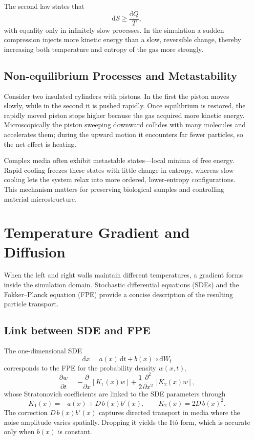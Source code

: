 \documentclass[12pt,a4paper]{article}
\begin{document}
The second law states that
\begin{equation}
    \mathrm{d}S \ge \frac{\mathrm{d}Q}{T},
\end{equation}
with equality only in infinitely slow processes. In the simulation a sudden compression injects more kinetic energy than a slow, reversible change, thereby increasing both temperature and entropy of the gas more strongly.

\subsection{Non-equilibrium Processes and Metastability}
Consider two insulated cylinders with pistons. In the first the piston moves slowly, while in the second it is pushed rapidly. Once equilibrium is restored, the rapidly moved piston stops higher because the gas acquired more kinetic energy. Microscopically the piston sweeping downward collides with many molecules and accelerates them; during the upward motion it encounters far fewer particles, so the net effect is heating.

Complex media often exhibit metastable states---local minima of free energy. Rapid cooling freezes these states with little change in entropy, whereas slow cooling lets the system relax into more ordered, lower-entropy configurations. This mechanism matters for preserving biological samples and controlling material microstructure.

\section{Temperature Gradient and Diffusion}
When the left and right walls maintain different temperatures, a gradient forms inside the simulation domain. Stochastic differential equations (SDEs) and the Fokker--Planck equation (FPE) provide a concise description of the resulting particle transport.

\subsection{Link between SDE and FPE}
The one-dimensional SDE
\begin{equation}
    \mathrm{d}x = a(x)\, \mathrm{d}t + b(x)\, \circ \mathrm{d}W_t
\end{equation}
corresponds to the FPE for the probability density $w(x, t)$,
\begin{equation}
    \frac{\partial w}{\partial t} = -\frac{\partial}{\partial x} \left[ K_1(x) w \right]
    + \frac{1}{2} \frac{\partial^2}{\partial x^2} \left[ K_2(x) w \right],
\end{equation}
whose Stratonovich coefficients are linked to the SDE parameters through
\begin{equation}
    K_1(x) = -a(x) + D\, b(x) b'(x), \qquad K_2(x) = 2 D\, b(x)^2.
\end{equation}
The correction $D\, b(x) b'(x)$ captures directed transport in media where the noise amplitude varies spatially. Dropping it yields the It\^{o} form, which is accurate only when $b(x)$ is constant.
\end{document}
